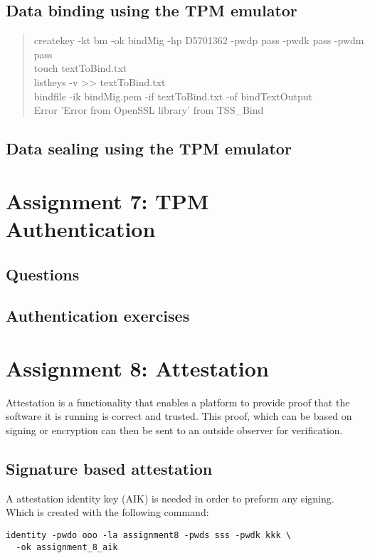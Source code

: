 \documentclass[10pt]{article}
\begin{document}
\subsection{Data binding using the TPM emulator}
\begin{quote}
createkey -kt bm -ok bindMig -hp D5701362 -pwdp pass -pwdk pass -pwdm pass \\
touch textToBind.txt\\
listkeys -v >> textToBind.txt \\
bindfile -ik bindMig.pem -if textToBind.txt -of bindTextOutput \\
Error 'Error from OpenSSL library' from TSS\_Bind
\end{quote}

\subsection{Data sealing using the TPM emulator}
\section{Assignment 7: TPM Authentication}
\subsection{Questions}
\subsection{Authentication exercises}
\section{Assignment 8: Attestation}

  Attestation is a functionality that enables a platform to provide proof that
  the software it is running is correct and trusted. This proof, which can be
  based on signing or encryption can then be sent to an outside observer for
  verification.

  \subsection{Signature based attestation}

    A attestation identity key (AIK) is needed in order to preform any signing.
    Which is created with the following command:
\begin{verbatim}
identity -pwdo ooo -la assignment8 -pwds sss -pwdk kkk \
  -ok assignment_8_aik
\end{verbatim}
\end{document}
